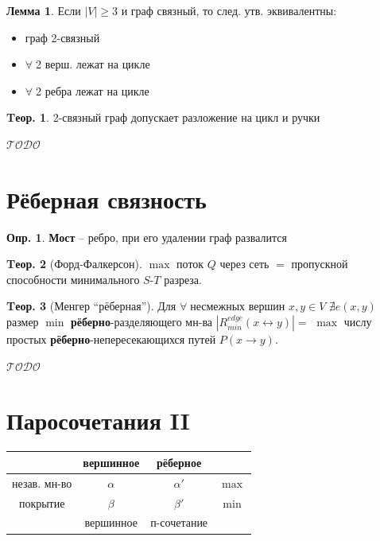 \documentclass[a4paper,12pt]{article}
\theoremstyle{definition}
\newtheorem{definition}{Опр.}[section]
\theoremstyle{definition}
\newtheorem{theorem}{Tеор.}[section]
\newtheorem{lemma}{Лемма}[section]
\def\iiany{$\forall\;$}
\def\iiTODO{\guillemotleft$\mathcal{TODO}$\guillemotright\textellipsis}
\begin{document}
\begin{lemma}
	Если $|V| \geqslant 3$ и граф связный, то след. утв. эквивалентны:
	\begin{itemize}
		\item  граф 2-связный
		\item  \iiany 2 верш. лежат на цикле
		\item  \iiany 2 ребра лежат на цикле
	\end{itemize}
\end{lemma}

\begin{theorem}
	2-связный граф допускает разложение на цикл и ручки
\end{theorem}

\iiTODO



\section{Рёберная связность}

\begin{definition}
	\textbf{Мост} -- ребро, при его удалении граф развалится
\end{definition}

\begin{theorem}[Форд-Фалкерсон]
	$\max$ поток $Q$ через сеть $=$ пропускной способности минимального $S$-$T$ разреза.
\end{theorem}

\begin{theorem}[Менгер ``рёберная'']
	Для \iiany несмежных вершин $x,y \in V$ $\nexists e(x,y)$ размер $\min$ \textbf{рёберно}-разделяющего мн-ва $|R^{edge}_{min}(x \leftrightarrow y)|=$ $\max$ числу простых \textbf{рёберно}-непересекающихся путей $P(x \rightarrow y)$.
\end{theorem}

\iiTODO



\section{Паросочетания II}

\begin{center}
  \begin{tabular}{|c|c|c|c|}
	\cline{2-3}
	\multicolumn{1}{c|}{} & вершинное & рёберное     & \multicolumn{1}{|c}{} \\ \hline
	незав. мн-во          & $\alpha$  & $\alpha'$    & $\max$                \\ \hline
	покрытие              & $\beta$   & $\beta'$     & $\min$                \\ \hline
	\multicolumn{1}{c|}{} & вершинное & п-сочетание  & \multicolumn{1}{|c}{} \\ \cline{2-3}
  \end{tabular}
\end{center}
\end{document}
